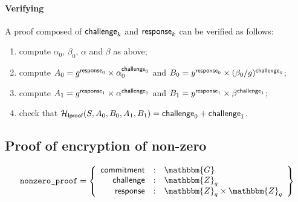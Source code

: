 \documentclass[a4paper]{article}
\newcommand{\G}{\mathbbm{G}}
\newcommand{\Z}{\mathbbm{Z}}
\begin{document}
\paragraph{Verifying} A proof composed of $\textsf{challenge}_k$ and
$\textsf{response}_k$ can be verified as follows:
\begin{enumerate}
\item compute $\alpha_0$, $\beta_0$, $\alpha$ and $\beta$ as above;
\item compute $A_0=g^{\textsf{response}_0}\times\alpha_0^{\textsf{challenge}_0}$ and
  $B_0=y^{\textsf{response}_0}\times(\beta_0/g)^{\textsf{challenge}_0}$;
\item compute $A_1=g^{\textsf{response}_1}\times\alpha^{\textsf{challenge}_1}$ and
  $B_1=y^{\textsf{response}_1}\times\beta^{\textsf{challenge}_1}$;
\item check that
  $\mathcal{H}_{\textsf{lproof}}(S,A_0,B_0,A_1,B_1) =
  \textsf{challenge}_0+\textsf{challenge}_1$.
\end{enumerate}

\subsection{Proof of encryption of non-zero}
\label{nonzero-proof}

\begin{gather*}
  \texttt{nonzero\_proof}=\left\{
    \begin{array}{rcl}
      \textsf{commitment}&:&\G\\
      \challenge&:&\Z_q\\
      \response&:&\Z_q\times\Z_q
    \end{array}
  \right\}
\end{gather*}
\end{document}
